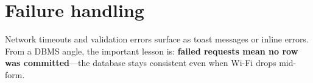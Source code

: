 \section{Failure handling}
Network timeouts and validation errors surface as toast messages or inline errors. From a DBMS angle, the important lesson is: \textbf{failed requests mean no row was committed}---the database stays consistent even when Wi-Fi drops mid-form.
